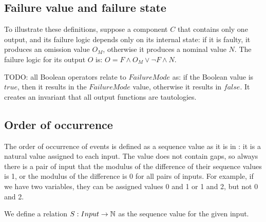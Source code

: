\subsection{Failure value and failure state}

%
%

To illustrate these definitions, suppose a component $C$ that contains only one output, and its failure logic depends only on its internal state: if it is faulty, it produces an omission value $O_M$, otherwise it produces a nominal value $N$. 
%
The failure logic for its output $O$ is: $O = F \land O_M \lor \lnot F \land N$.

TODO: all Boolean operators relate to $FailureMode$ as: if the Boolean value is $true$, then it results in the $FailureMode$ value, otherwise it results in $false$. It creates an invariant that all output functions are tautologies.

\subsection{Order of occurrence}

The order of occurrence of events is defined as a sequence value as it is in \HIPHOPS: it is a natural value assigned to each input.
%
The value does not contain gaps, so always there is a pair of input that the modulus of the difference of their sequence values is 1, or the modulus of the difference is 0 for all pairs of inputs.
%
For example, if we have two variables, they can be assigned values 0 and 1 or 1 and 2, but not 0 and 2. 

We define a relation $S : Input \rightarrow \mathbb{N} $ as the sequence value for the given input.

